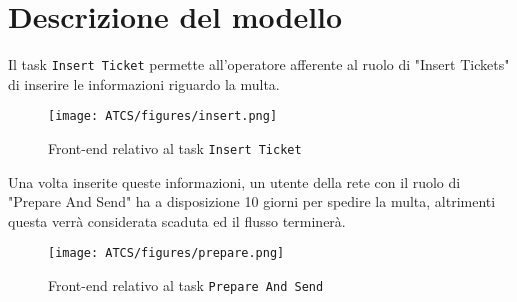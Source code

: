 \documentclass[../Relazione.tex]{subfiles}
\begin{document}
\section{Descrizione del modello}

    Il task \texttt{Insert Ticket} permette all'operatore afferente al ruolo di "Insert Tickets" di inserire le informazioni riguardo la multa.
    
    \begin{figure}[h]
        \centering
        \texttt{[image: ATCS/figures/insert.png]}
        \caption{Front-end relativo al task \texttt{Insert Ticket}}
        \label{fig:insert}
    \end{figure}
    
    \noindent Una volta inserite queste informazioni, un utente della rete con il ruolo di "Prepare And Send" ha a disposizione 10 giorni per spedire la multa, altrimenti questa verrà considerata scaduta ed il flusso terminerà.
    
    \begin{figure}[h]
        \centering
        \texttt{[image: ATCS/figures/prepare.png]}
        \caption{Front-end relativo al task \texttt{Prepare And Send}}
        \label{fig:prepare}
    \end{figure}
    
\end{document}
